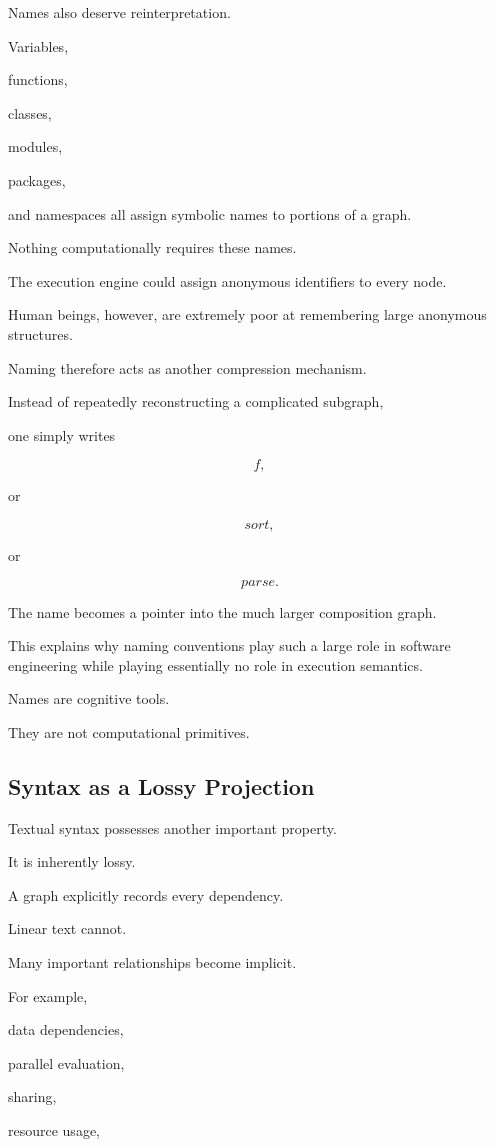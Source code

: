 \documentclass[12pt,oneside]{article}
\begin{document}
Names also deserve reinterpretation.

Variables,

functions,

classes,

modules,

packages,

and namespaces all assign symbolic names to portions of a graph.

Nothing computationally requires these names.

The execution engine could assign anonymous identifiers to every node.

Human beings, however, are extremely poor at remembering large anonymous structures.

Naming therefore acts as another compression mechanism.

Instead of repeatedly reconstructing a complicated subgraph,

one simply writes

\[
f,
\]

or

\[
sort,
\]

or

\[
parse.
\]

The name becomes a pointer into the much larger composition graph.

This explains why naming conventions play such a large role in software engineering while playing essentially no role in execution semantics.

Names are cognitive tools.

They are not computational primitives.

\subsection{Syntax as a Lossy Projection}

Textual syntax possesses another important property.

It is inherently lossy.

A graph explicitly records every dependency.

Linear text cannot.

Many important relationships become implicit.

For example,

data dependencies,

parallel evaluation,

sharing,

resource usage,
\end{document}
